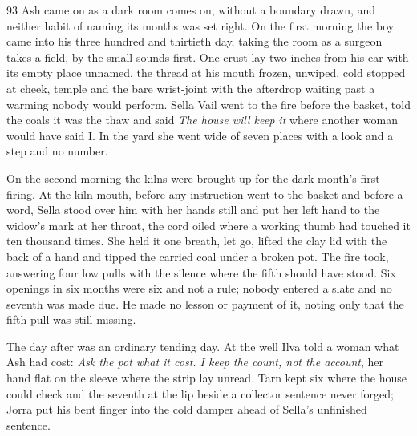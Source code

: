 
\scenebreak


\scenebreak


\scenebreak

\CRtailpiece
\begin{CRchronicle}{93}
Ash came on as a dark room comes on, without a boundary drawn, and neither habit of naming its months was set right. On the first morning the boy came into his three hundred and thirtieth day, taking the room as a surgeon takes a field, by the small sounds first. One crust lay two inches from his ear with its empty place unnamed, the thread at his mouth frozen, unwiped, cold stopped at cheek, temple and the bare wrist-joint with the afterdrop waiting past a warming nobody would perform. Sella Vail went to the fire before the basket, told the coals it was the thaw and said \emph{The house will keep it} where another woman would have said I. In the yard she went wide of seven places with a look and a step and no number.

On the second morning the kilns were brought up for the dark month’s first firing. At the kiln mouth, before any instruction went to the basket and before a word, Sella stood over him with her hands still and put her left hand to the widow’s mark at her throat, the cord oiled where a working thumb had touched it ten thousand times. She held it one breath, let go, lifted the clay lid with the back of a hand and tipped the carried coal under a broken pot. The fire took, answering four low pulls with the silence where the fifth should have stood. Six openings in six months were six and not a rule; nobody entered a slate and no seventh was made due. He made no lesson or payment of it, noting only that the fifth pull was still missing.

The day after was an ordinary tending day. At the well Ilva told a woman what Ash had cost: \emph{Ask the pot what it cost. I keep the count, not the account}, her hand flat on the sleeve where the strip lay unread. Tarn kept six where the house could check and the seventh at the lip beside a collector sentence never forged; Jorra put his bent finger into the cold damper ahead of Sella’s unfinished sentence.


\end{CRchronicle}
